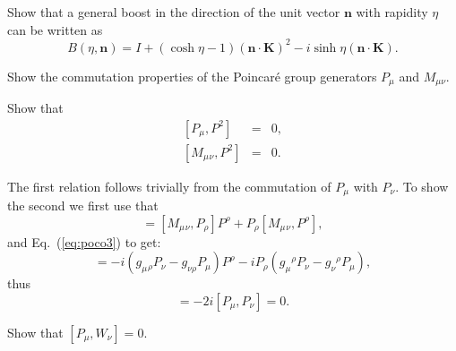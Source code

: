 \documentclass[notes.tex]{subfiles}
\begin{document}
\begin{Exercise}[]
Show that a general boost in the direction of the unit vector $\mathbf n$ with rapidity $\eta$ can be written as
\begin{equation*}
B(\eta,\mathbf n)=I+(\cosh\eta-1)(\mathbf n \cdot \mathbf K)^2-i\sinh\eta (\mathbf n \cdot \mathbf K).
\end{equation*}
\end{Exercise}


\begin{Exercise}[]
Show the commutation properties of the Poincaré group generators $P_\mu$ and $M_{\mu\nu}$.
\end{Exercise}

\begin{Exercise}[]
Show that
\begin{eqnarray*}
\left[P_\mu, P^2\right] &=& 0,\\
\left[M_\mu{}_{\nu}, P^2\right]& =& 0.
\end{eqnarray*}
\end{Exercise}

\begin{Answer} 
The first relation follows trivially from the commutation of $P_\mu$ with $P_\nu$. To show the second
we first use that
\begin{equation*}
[M_\mu{}_\nu, P_\rho P^\rho] = [M_\mu{}_\nu, P_\rho] P^\rho  + P_\rho [M_\mu{}_\nu,  P^\rho],
\end{equation*}
and Eq.~(\ref{eq:poco3}) to get:
\begin{equation*}
[M_\mu{}_\nu, P_\rho P^\rho] = -i(g_\mu{}_\rho P_\nu - g_{\nu \rho} P_\mu) P^\rho  - iP_\rho (g_\mu{}^\rho P_\nu - g_{\nu}{}^{ \rho} P_\mu),
\end{equation*}
thus
\begin{equation*}
[M_\mu{}_\nu, P_\rho P^\rho] = -2i[P_\mu, P_\nu] = 0.
\end{equation*}
\end{Answer}

\begin{Exercise}[]
Show that $[P_\mu,W_\nu]=0$.
\end{Exercise}
\end{document}
